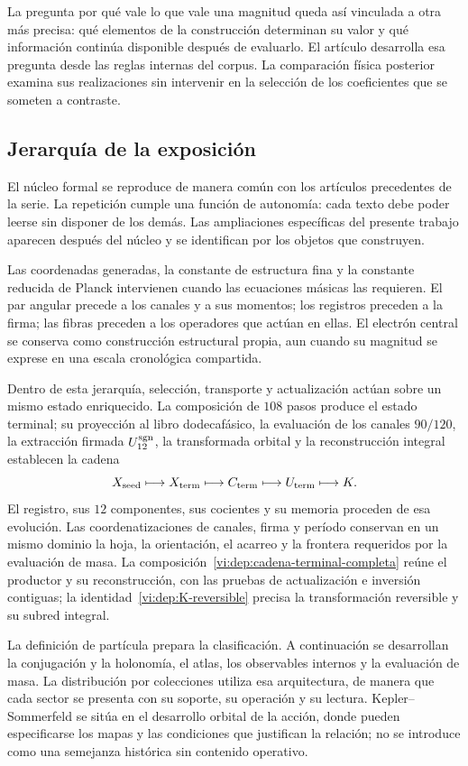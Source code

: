 La pregunta por qué vale lo que vale una magnitud queda así vinculada a
otra más precisa: qué elementos de la construcción determinan su valor y
qué información continúa disponible después de evaluarlo. El artículo
desarrolla esa pregunta desde las reglas internas del corpus. La
comparación física posterior examina sus realizaciones sin intervenir en
la selección de los coeficientes que se someten a contraste.

\subsection{Jerarquía de la exposición}

El núcleo formal se reproduce de manera común con los artículos
precedentes de la serie. La repetición cumple una función de autonomía:
cada texto debe poder leerse sin disponer de los demás. Las ampliaciones
específicas del presente trabajo aparecen después del núcleo y se
identifican por los objetos que construyen.

Las coordenadas generadas, la constante de estructura fina y la constante
reducida de Planck intervienen cuando las ecuaciones másicas las
requieren. El par angular precede a los canales y a sus momentos; los
registros preceden a la firma; las fibras preceden a los operadores que
actúan en ellas. El electrón central se conserva como construcción
estructural propia, aun cuando su magnitud se exprese en una escala
cronológica compartida.

Dentro de esta jerarquía, selección, transporte y actualización actúan
sobre un mismo estado enriquecido. La composición de \(108\) pasos
produce el estado terminal; su proyección al libro dodecafásico, la
evaluación de los canales \(90/120\), la extracción firmada
\(U_{12}^{\rm sgn}\), la transformada orbital y la reconstrucción
integral establecen la cadena
\[
 X_{\rm seed}\longmapsto X_{\rm term}\longmapsto
 C_{\rm term}\longmapsto U_{\rm term}\longmapsto K.
\]
El registro, sus \(12\) componentes, sus cocientes y su memoria proceden
de esa evolución. Las coordenatizaciones de canales, firma y período conservan en un
mismo dominio la hoja, la orientación, el acarreo y la frontera requeridos
por la evaluación de masa. La composición~\eqref{vi:dep:cadena-terminal-completa}
reúne el productor y su reconstrucción, con las pruebas de actualización e
inversión contiguas; la identidad~\eqref{vi:dep:K-reversible} precisa la
transformación reversible y su subred integral.

La definición de partícula prepara la clasificación. A continuación se
desarrollan la conjugación y la holonomía, el atlas, los observables
internos y la evaluación de masa. La distribución por colecciones utiliza
esa arquitectura, de manera que cada sector se presenta con su soporte,
su operación y su lectura. Kepler--Sommerfeld se sitúa en el desarrollo
orbital de la acción, donde pueden especificarse los mapas y las
condiciones que justifican la relación; no se introduce como una
semejanza histórica sin contenido operativo.

